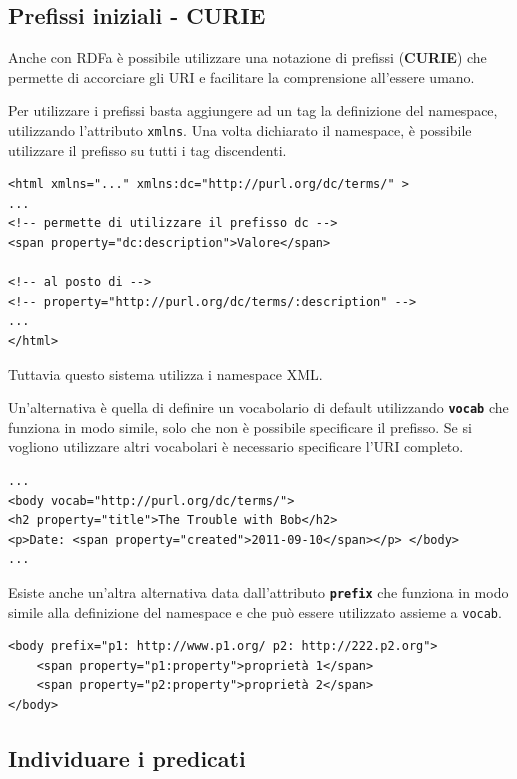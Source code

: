 \subsection{Prefissi iniziali - CURIE}

Anche con RDFa è possibile utilizzare una notazione di prefissi (\textbf{CURIE}) che permette di accorciare gli URI e facilitare la comprensione all'essere umano.

Per utilizzare i prefissi basta aggiungere ad un tag la definizione del namespace, utilizzando l'attributo \texttt{xmlns}.
Una volta dichiarato il namespace, è possibile utilizzare il prefisso su tutti i tag discendenti.

\begin{lstlisting}[language=RDFA]
<html xmlns="..." xmlns:dc="http://purl.org/dc/terms/" > 
...
<!-- permette di utilizzare il prefisso dc -->
<span property="dc:description">Valore</span>

<!-- al posto di -->
<!-- property="http://purl.org/dc/terms/:description" -->
...
</html>
\end{lstlisting}

\noindent Tuttavia questo sistema utilizza i namespace XML.

Un'alternativa è quella di definire un vocabolario di default utilizzando \textbf{\texttt{vocab}} che funziona in modo simile, solo che non è possibile specificare il prefisso.
Se si vogliono utilizzare altri vocabolari è necessario specificare l'URI completo.

\begin{lstlisting}[caption=Utilizzo di vocab, language=RDFA]
...
<body vocab="http://purl.org/dc/terms/">
<h2 property="title">The Trouble with Bob</h2>
<p>Date: <span property="created">2011-09-10</span></p> </body>
...
\end{lstlisting}

\noindent Esiste anche un'altra alternativa data dall'attributo \textbf{\texttt{prefix}} che funziona in modo simile alla definizione del namespace e che può essere utilizzato assieme a \texttt{vocab}.

\begin{lstlisting}[caption=Utilizzo di prefix, language=RDFA]
<body prefix="p1: http://www.p1.org/ p2: http://222.p2.org"> 
	<span property="p1:property">proprietà 1</span>
	<span property="p2:property">proprietà 2</span>
</body>
\end{lstlisting}

\subsection{Individuare i predicati}

